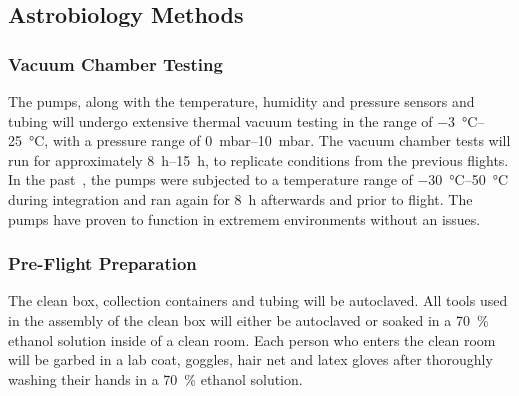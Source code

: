\subsection{Astrobiology Methods}
\label{sec:Astrobiology Methods}

\subsubsection{Vacuum Chamber Testing}


The pumps, along with the temperature, humidity and pressure sensors and tubing will undergo extensive thermal vacuum testing in the range of \SIrange{-3}{25}{\celsius}, with a pressure range of \SIrange{0}{10}{\milli\bar}. The vacuum chamber tests will run for approximately \SIrange{8}{15}{\hour}, to replicate conditions from the previous flights. In the past~\cite{SORA}, the pumps were subjected to a temperature range of \SIrange{-30}{50}{\celsius} during integration and ran again for \SI{8}{\hour} afterwards and prior to flight. The pumps have proven to function in extremem environments without an issues. 


\subsubsection{Pre-Flight Preparation}


The clean box, collection containers and tubing will be autoclaved. All tools used in the assembly of the clean box will either be autoclaved or soaked in a \SI{70}{\percent} ethanol solution inside of a clean room. Each person who enters the clean room will be garbed in a lab coat, goggles, hair net and latex gloves after thoroughly washing their hands in a \SI{70}{\percent} ethanol solution. 





